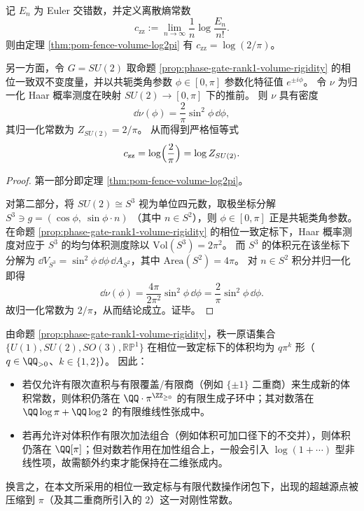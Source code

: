 \begin{corollary}\label{cor:zigzag-entropy-su2-weyl-constant}
记 \(E_n\) 为 Euler 交错数，并定义离散熵常数
\[
c_{\mathrm{zz}}:=\lim_{n\to\infty}\frac1n\log\frac{E_n}{n!}.
\]
则由定理 \ref{thm:pom-fence-volume-log2pi} 有 \(c_{\mathrm{zz}}=\log(2/\pi)\)。
\par
另一方面，令 \(G=SU(2)\) 取命题 \ref{prop:phase-gate-rank1-volume-rigidity} 的相位一致双不变度量，并以共轭类角参数 \(\phi\in[0,\pi]\) 参数化特征值 \(e^{\pm i\phi}\)。
令 \(\nu\) 为归一化 Haar 概率测度在映射 \(SU(2)\to[0,\pi]\) 下的推前。
则 \(\nu\) 具有密度
\[
\dd\nu(\phi)=\frac{2}{\pi}\sin^{2}\phi\,\dd\phi,
\]
其归一化常数为 \(Z_{SU(2)}=2/\pi\)。
从而得到严格恒等式
\[
c_{\mathrm{zz}}=\log\Bigl(\frac{2}{\pi}\Bigr)=\log Z_{SU(2)}.
\]
\end{corollary}
\begin{proof}
第一部分即定理 \ref{thm:pom-fence-volume-log2pi}。
\par
对第二部分，将 \(SU(2)\cong S^{3}\) 视为单位四元数，取极坐标分解
\(
S^{3}\ni g=(\cos\phi,\ \sin\phi\cdot n)
\)
（其中 \(n\in S^{2}\)），则 \(\phi\in[0,\pi]\) 正是共轭类角参数。
在命题 \ref{prop:phase-gate-rank1-volume-rigidity} 的相位一致定标下，Haar 概率测度对应于 \(S^{3}\) 的均匀体积测度除以 \(\mathrm{Vol}(S^{3})=2\pi^{2}\)。
而 \(S^{3}\) 的体积元在该坐标下分解为
\(
\dd V_{S^{3}}=\sin^{2}\phi\,\dd\phi\,\dd A_{S^{2}}
\)，其中 \(\mathrm{Area}(S^{2})=4\pi\)。
对 \(n\in S^{2}\) 积分并归一化即得
\[
\dd\nu(\phi)=\frac{4\pi}{2\pi^{2}}\sin^{2}\phi\,\dd\phi=\frac{2}{\pi}\sin^{2}\phi\,\dd\phi.
\]
故归一化常数为 \(2/\pi\)，从而结论成立。证毕。
\end{proof}

\begin{remark}\label{rem:phase-gate-volume-constants-closure}
由命题 \ref{prop:phase-gate-rank1-volume-rigidity}，秩一原语集合
\(
\{U(1),SU(2),SO(3),\mathbb{RP}^{1}\}
\)
在相位一致定标下的体积均为 \(q\pi^{k}\) 形（\(q\in\QQ_{>0}\)、\(k\in\{1,2\}\)）。
因此：
\begin{itemize}
  \item 若仅允许有限次直积与有限覆盖/有限商（例如 \(\{\pm 1\}\) 二重商）来生成新的体积常数，则体积仍落在 \(\QQ\cdot\pi^{\ZZ_{\ge 0}}\) 的有限生成子环中；其对数落在 \(\QQ\log\pi+\QQ\log 2\) 的有限维线性张成中。
  \item 若再允许对体积作有限次加法组合（例如体积可加口径下的不交并），则体积仍落在 \(\QQ[\pi]\)；但对数若作用在加性组合上，一般会引入 \(\log(1+\cdots)\) 型非线性项，故需额外约束才能保持在二维张成内。
\end{itemize}
换言之，在本文所采用的相位一致定标与有限代数操作闭包下，出现的超越源点被压缩到 \(\pi\)（及其二重商所引入的 \(2\)）这一对刚性常数。
\end{remark}
